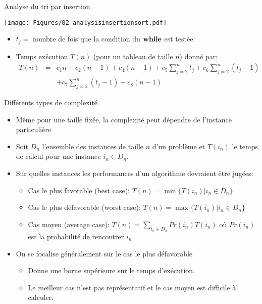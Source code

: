 \begin{frame}{Analyse du tri par insertion}
\centerline{\texttt{[image: Figures/02-analysisinsertionsort.pdf]}}
\begin{itemize}
\item $t_j=$ nombre de fois que la condition du $\textbf{while}$ est testée.
\item Temps exécution $T(n)$ (pour un tableau de taille $n$) donné par:
{\footnotesize
\begin{eqnarray*}
T(n)&=&c_1 n +c_2(n-1)+c_4(n-1)+c_5\sum_{j=2}^n t_j + c_6 \sum_{j=2}^n (t_j-1)\\
&&+c_7\sum_{j=2}^n (t_j-1)+c_8(n-1)
\end{eqnarray*}}
\end{itemize}
\end{frame}

\begin{frame}{Différents types de complexité}
\begin{itemize}
\item Même pour une taille fixée, la complexité peut dépendre de l'instance particulière
\item Soit $D_n$ l'ensemble des instances de taille $n$ d'un problème et $T(i_n)$ le temps de calcul pour une instance $i_n\in D_n$.
\item Sur quelles instances les performances d'un algorithme devraient être jugées:
\begin{itemize}
\item Cas le plus favorable (best case): $T(n)=\min\{T(i_n)| i_n\in D_n\}$
\item Cas le plus défavorable (worst case): $T(n)=\max\{T(i_n)| i_n\in D_n\}$
\item Cas moyen (average case): $T(n)=\sum_{i_n\in D_n} Pr(i_n) T(i_n)$ où $Pr(i_n)$ est la probabilité de rencontrer $i_n$
\end{itemize}
\item On se focalise généralement sur le cas \alert{le plus défavorable}
\begin{itemize}
\item Donne une borne supérieure sur le temps d'exécution.
\item Le meilleur cas n'est pas représentatif et le cas moyen est difficile à calculer.
\end{itemize}
\end{itemize}
\end{frame}

